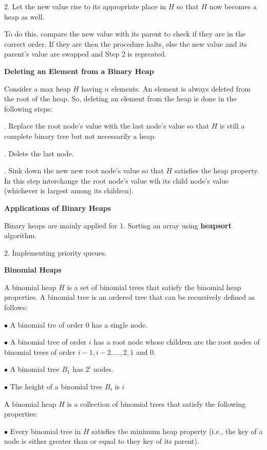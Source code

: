 \vskip 3mm
2. Let the new value rise to its appropriate place in $H$ so that $H$ now becomes a heap as well.

\vskip 1mm
To do this, compare the new value with its parent to check if they are in the correct order. If they are then the procedure halts, else the new value and its parent's value are swapped and Step 2 is repreated.

\filbreak
\vskip 1cm
{\bf Deleting an Element from a Binary Heap}

\vskip 1mm
Consider a max heap $H$ having $n$ elements. An element is always deleted from the root of the heap. So, deleting an element from the heap is done in the following steps:

\vskip 2mm
. Replace the root node's value with the last node's value so that $H$ is still a complete binary tree but not necessarily a heap.

\vskip 3mm
. Delete the last node.

\vskip 3mm
. Sink down the new new root node's value so that $H$ satisfies the heap property. In this step interchange the root node's value wih its child node's value (whichever is largest among its children).

\filbreak
\vskip 1cm
{\bf Applications of Binary Heaps}

\vskip 1mm
Binary heaps are mainly applied for
\vskip 2mm
1. Sorting an array using {\bf heapsort} algorithm.

\vskip 3mm
2. Implementing priority queues.

\filbreak
\vskip 1cm
{\bf Binomial Heaps}

\vskip 1mm
A binomial heap $H$ is a set of binomial trees that satisfy the binomial heap properties. A binomial tree is an ordered tree that can be recursively defined as follows:

\vskip 2mm
\qquad$\bullet$ A binomial tre of order $0$ has a single node.

\vskip 3mm
\qquad$\bullet$ A binomial tree of order $i$ has a root node whose children are the root nodes of binomial trees of order $i-1,i-2,\ldots, 2,1$ and $0$.

\vskip 3mm
\qquad$\bullet$ A binomial tree $B_1$ has $2^i$ nodes.

\vskip 3mm
\qquad$\bullet$ The height of a binomial tree $B_i$ is $i$

\vskip 3mm
A binomial heap $H$ is a collection of binomial trees that satisfy the following properties:

\vskip 2mm
\qquad$\bullet$ Every binomial tree in $H$ satisfies the minimum heap property (i.e., the key of a node is either greater than or equal to they key of its parent).

